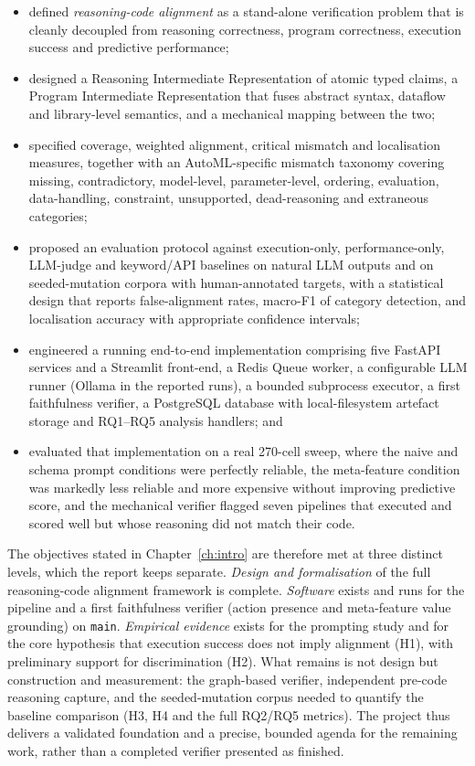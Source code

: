 \begin{itemize}
    \item defined \emph{reasoning-code alignment} as a stand-alone
    verification problem that is cleanly decoupled from reasoning
    correctness, program correctness, execution success and
    predictive performance;
    \item designed a Reasoning Intermediate Representation of
    atomic typed claims, a Program Intermediate Representation that
    fuses abstract syntax, dataflow and library-level semantics,
    and a mechanical mapping between the two;
    \item specified coverage, weighted alignment, critical mismatch
    and localisation measures, together with an AutoML-specific
    mismatch taxonomy covering missing, contradictory,
    model-level, parameter-level, ordering, evaluation,
    data-handling, constraint, unsupported, dead-reasoning and
    extraneous categories;
    \item proposed an evaluation protocol against execution-only,
    performance-only, LLM-judge and keyword/API baselines on
    natural LLM outputs and on seeded-mutation corpora with
    human-annotated targets, with a statistical design that
    reports false-alignment rates, macro-F1 of category detection,
    and localisation accuracy with appropriate confidence
    intervals;
    \item engineered a running end-to-end implementation comprising five
    FastAPI services and a Streamlit front-end, a Redis Queue worker, a
    configurable LLM runner (Ollama in the reported runs), a bounded
    subprocess executor, a first faithfulness verifier, a PostgreSQL
    database with
    local-filesystem artefact storage and RQ1--RQ5 analysis handlers;
    and
    \item evaluated that implementation on a real 270-cell sweep,
    where the naive and schema prompt conditions were perfectly
    reliable, the meta-feature condition was markedly less reliable
    and more expensive without improving predictive score, and the
    mechanical verifier flagged seven pipelines that executed and
    scored well but whose reasoning did not match their code.
\end{itemize}

The objectives stated in Chapter~\ref{ch:intro} are therefore met at
three distinct levels, which the report keeps separate.
\emph{Design and formalisation} of the full reasoning-code alignment
framework is complete. \emph{Software} exists and runs for the
pipeline and a first faithfulness verifier (action presence and
meta-feature value grounding) on \texttt{main}. \emph{Empirical
evidence} exists for the prompting study and for the core hypothesis
that execution success does not imply alignment (H1), with preliminary
support for discrimination (H2). What remains is not design but
construction and measurement: the graph-based verifier, independent
pre-code reasoning capture, and the seeded-mutation corpus needed to
quantify the baseline comparison (H3, H4 and the full RQ2/RQ5
metrics). The project thus delivers a validated foundation and a
precise, bounded agenda for the remaining work, rather than a
completed verifier presented as finished.

